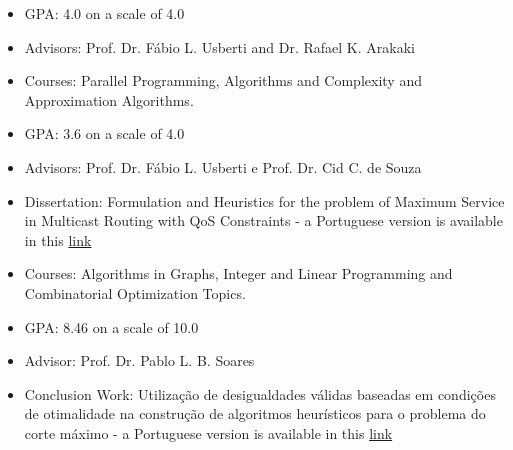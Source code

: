 \documentclass[10pt,a4paper,ragged2e,withhyper]{altacv}
\begin{document}
    \begin{paracol}{1}
            \medskip
            \medskip
            \begin{itemize}
            \item{GPA: 4.0 on a scale of 4.0}
			      \item{Advisors: Prof. Dr. Fábio L. Usberti and Dr. Rafael K. Arakaki}
			      \item{Courses: \textcolor{SecondaryColor}{Parallel Programming},
                \textcolor{SecondaryColor}{Algorithms and Complexity} and
                \textcolor{SecondaryColor}{Approximation Algorithms}.}
		      \end{itemize}
            \divider
            \medskip
            \begin{itemize}
            \item{GPA: 3.6 on a scale of 4.0}
			      \item{Advisors: Prof. Dr. Fábio L. Usberti e Prof. Dr. Cid C. de Souza}
			      \item{Dissertation: Formulation and Heuristics for the problem of
                Maximum Service in Multicast Routing with QoS Constraints -
                a Portuguese version is available in this \href{https://hdl.handle.net/20.500.12733/1641777}{\textcolor{ThirdColor}{link}}}
			      \item{Courses: \textcolor{SecondaryColor}{Algorithms in Graphs},
                \textcolor{SecondaryColor}{Integer and Linear Programming} and
                \textcolor{SecondaryColor}{Combinatorial Optimization Topics}.}
		      \end{itemize}
            \divider
            \begin{itemize}
            \item{GPA: 8.46 on a scale of 10.0}
          \item{Advisor: Prof. Dr. Pablo L. B. Soares}
          \item{Conclusion Work: Utilização de desigualdades válidas baseadas
                em condições de otimalidade na construção de algoritmos
                heurísticos para o problema do corte máximo - a Portuguese
                version is available in this \href{http://www.repositorio.ufc.br/handle/riufc/39085}{\textcolor{ThirdColor}{link}}}
		      \end{itemize}
		      

\end{paracol}
\end{document}
